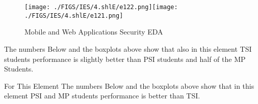 \documentclass[12pt]{extreport}
\begin{document}
\begin{figure}[H]
	\centering
	\texttt{[image: ./FIGS/IES/4.shlE/e122.png]}\texttt{[image: ./FIGS/IES/4.shlE/e121.png]}
	\caption{Mobile and Web Applications Security EDA}
	\label{fig:57}
\end{figure}

The numbers Below and the boxplots above show that also in this element  TSI students performance is slightly better than PSI students and half of the MP Students.

For This Element The numbers Below and the boxplots above show that in this element  PSI and MP students performance is  better than TSI.


\begin{comment}

\subparagraph{Interpretation of the Box-plots:}
For This Element 

\begin{enumerate}	
	\item The MP Class Box-Plot:
	\begin{enumerate}
		\item MAX = a {} {} {} {} {} {} {} {} UQ = b {} {} {} {} {} {} {} {} Median = c
		\item LQ = d {} {} {} {} {} {} {} {}  MIN =	l {} {} {} {} {} {} {} {}  IQR = e - f = g
	\end{enumerate}
	\item The PSI Class Box-Plot:
	\begin{enumerate}
		\item MAX = a {} {} {} {} {} {} {} {} UQ = b {} {} {} {} {} {} {} {} Median = c
		\item LQ = d {} {} {} {} {} {} {} {}  MIN =	e {} {} {} {} {} {} {} {} IQR = f - g = h	
	\end{enumerate}
	\item The TSI Class Box-Plot:
	\begin{enumerate}
		\item MAX = a {} {} {} {} {} {} {} {} UQ = b {} {} {} {} {} {} {} {} Median = c
		\item LQ = d {} {} {} {} {} {} {} {} MIN = e {} {} {} {} {} {} {} {} IQR = f - g = h	
	\end{enumerate}
\end{enumerate}



\subparagraph{Interpretation of the histogram:}
This Frequency Distribution is (Skeness) with the following descriptive statistics:
\begin{enumerate}
	\item Mean = 
	\item STD = 
	\item Range = a - b = c
	\item IQR = a-b = c 
\end{enumerate}

\end{comment}
\end{document}

